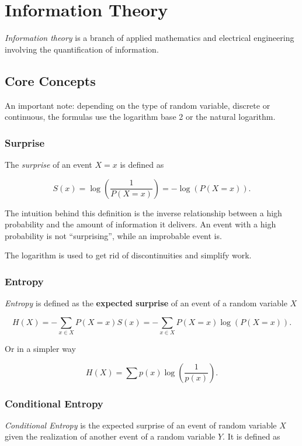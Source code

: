 \chapter{Information Theory}

\emph{Information theory} is a branch of applied mathematics and electrical engineering involving the quantification of information. 

\section{Core Concepts}

An important note: depending on the type of random variable, discrete or continuous, the formulas use the logarithm base 2 or the natural logarithm.

\subsection{Surprise}

The \emph{surprise} of an event \(X = x\) is defined as 

\[
    S(x) = \log \left(\frac{1}{P(X = x)}\right) = - \log(P(X = x)).
\]

The intuition behind this definition is the inverse relationship between a high probability and the amount of information it delivers. An event with a high probability is not 
``surprising'', while an improbable event is.

The logarithm is used to get rid of discontinuities and simplify work.

\subsection{Entropy}

\emph{Entropy} is defined as the \textbf{expected surprise} of an event of a random variable \(X\) 

\[
     H(X) = -\sum_{x \in X} P(X = x) S(x) = -\sum_{x \in X} P(X = x) \log(P(X = x)).
\]

Or in a simpler way

\[
    H(X) = \sum p(x) \log\left(\frac{1}{p(x)}\right).
\]

\subsection{Conditional Entropy}

\emph{Conditional Entropy} is the expected surprise of an event of random variable \(X\) given the realization of another event of a random variable \(Y\). 
It is defined as

